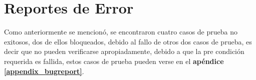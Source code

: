 \section{Reportes de Error}
Como anteriormente se mencionó, se encontraron cuatro casos de prueba no
exitosos, dos de ellos bloqueados, debido al fallo de otros dos casos de
prueba, es decir que no pueden verificarse apropiadamente, debido a que la
pre condición requerida es fallida, estos casos de prueba pueden verse en el
\textbf{apéndice \ref{appendix_bugreport}}.

